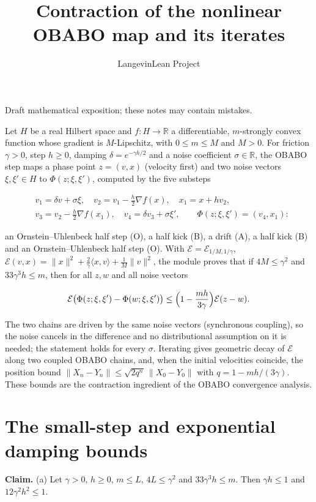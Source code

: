 \documentclass[11pt,a4paper]{article}
\title{\texorpdfstring{Contraction of the nonlinear OBABO map and its iterates}{Contraction of the nonlinear OBABO map and its iterates}}
\author{LangevinLean Project}
\date{}
\begin{document}
\maketitle
Draft mathematical exposition; these notes may contain mistakes.


Let \(H\) be a real Hilbert space and \(f:H\to\mathbb R\) a differentiable, \(m\)-strongly convex function whose gradient is \(M\)-Lipschitz, with \(0\le m\le M\) and \(M>0\). For friction \(\gamma>0\), step \(h\ge0\), damping \(\delta=e^{-\gamma h/2}\) and a noise coefficient \(\sigma\in\mathbb R\), the OBABO step maps a phase point \(z=(v,x)\) (velocity first) and two noise vectors \(\xi,\xi'\in H\) to \(\Phi(z;\xi,\xi')\), computed by the five substeps


\[\begin{aligned}&v_1=\delta v+\sigma\xi,\quad v_2=v_1-\tfrac h2\nabla f(x),\quad x_1=x+hv_2,\\&v_3=v_2-\tfrac h2\nabla f(x_1),\quad v_4=\delta v_3+\sigma\xi',\qquad\Phi(z;\xi,\xi')=(v_4,x_1):\end{aligned}\]


an Ornstein–Uhlenbeck half step (O), a half kick (B), a drift (A), a half kick (B) and an Ornstein–Uhlenbeck half step (O). With \(\mathcal E=\mathcal E_{1/M,1/\gamma}\), \(\mathcal E(v,x)=\|x\|^2+\frac2\gamma\langle x,v\rangle+\frac1M\|v\|^2\), the module proves that if \(4M\le\gamma^2\) and \(33\gamma^3h\le m\), then for all \(z,w\) and all noise vectors


\[\mathcal E\bigl(\Phi(z;\xi,\xi')-\Phi(w;\xi,\xi')\bigr)\le\Bigl(1-\frac{mh}{3\gamma}\Bigr)\mathcal E(z-w).\]


The two chains are driven by the same noise vectors (synchronous coupling), so the noise cancels in the difference and no distributional assumption on it is needed; the statement holds for every \(\sigma\). Iterating gives geometric decay of \(\mathcal E\) along two coupled OBABO chains, and, when the initial velocities coincide, the position bound \(\|X_n-Y_n\|\le\sqrt{2q^n}\,\|X_0-Y_0\|\) with \(q=1-mh/(3\gamma)\). These bounds are the contraction ingredient of the OBABO convergence analysis.


\section{\texorpdfstring{The small-step and exponential damping bounds}{The small-step and exponential damping bounds}}


\textbf{Claim.} (a) Let \(\gamma>0\), \(h\ge0\), \(m\le L\), \(4L\le\gamma^2\) and \(33\gamma^3h\le m\). Then \(\gamma h\le1\) and \(12\gamma^2h^2\le1\).
\end{document}

